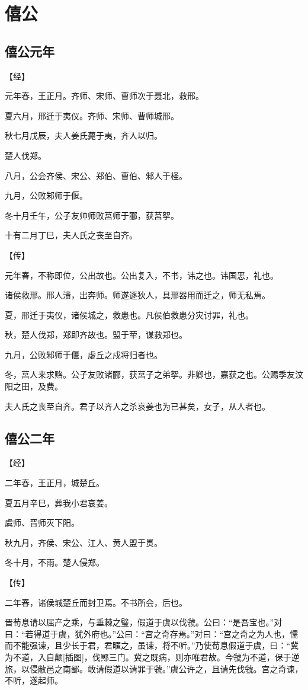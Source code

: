 \documentclass[a4paper,12pt,UTF8,twoside]{ctexbook}
\begin{document}
\part{僖公}

\chapter{僖公元年}

【经】

元年春，王正月。齐师、宋师、曹师次于聂北，救邢。

夏六月，邢迁于夷仪。齐师、宋师、曹师城邢。

秋七月戊辰，夫人姜氏薨于夷，齐人以归。

楚人伐郑。

八月，公会齐侯、宋公、郑伯、曹伯、邾人于柽。

九月，公败邾师于偃。

冬十月壬午，公子友帅师败莒师于郦，获莒挐。

十有二月丁巳，夫人氏之丧至自齐。

【传】

元年春，不称即位，公出故也。公出复入，不书，讳之也。讳国恶，礼也。

诸侯救邢。邢人溃，出奔师。师遂逐狄人，具邢器用而迁之，师无私焉。

夏，邢迁于夷仪，诸侯城之，救患也。凡侯伯救患分灾讨罪，礼也。

秋，楚人伐郑，郑即齐故也。盟于荦，谋救郑也。

九月，公败邾师于偃，虚丘之戍将归者也。

冬，莒人来求赂。公子友败诸郦，获莒子之弟挐。非卿也，嘉获之也。公赐季友汶阳之田，及费。

夫人氏之丧至自齐。君子以齐人之杀哀姜也为已甚矣，女子，从人者也。

\chapter{僖公二年}

【经】

二年春，王正月，城楚丘。

夏五月辛巳，葬我小君哀姜。

虞师、晋师灭下阳。

秋九月，齐侯、宋公、江人、黄人盟于贯。

冬十月，不雨。楚人侵郑。

【传】

二年春，诸侯城楚丘而封卫焉。不书所会，后也。

晋荀息请以屈产之乘，与垂棘之璧，假道于虞以伐虢。公曰：“是吾宝也。”对曰：“若得道于虞，犹外府也。”公曰：“宫之奇存焉。”对曰：“宫之奇之为人也，懦而不能强谏，且少长于君，君暱之，虽谏，将不听。”乃使荀息假道于虞，曰：“冀为不道，入自颠[插图]，伐鄍三门。冀之既病，则亦唯君故。今虢为不道，保于逆旅，以侵敝邑之南鄙。敢请假道以请罪于虢。”虞公许之，且请先伐虢。宫之奇谏，不听，遂起师。
\end{document}
